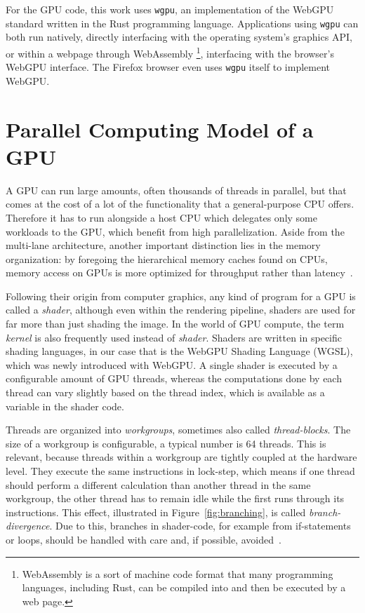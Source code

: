 For the GPU code, this work uses \texttt{wgpu}, an implementation of the WebGPU
standard written in the Rust programming language.
Applications using \texttt{wgpu} can both run natively, directly interfacing with the
operating system's graphics API,
or within a webpage through WebAssembly%
\footnote{WebAssembly is a sort of machine code format that many programming
languages, including Rust, can be compiled into
and then be executed by a web page.},
interfacing with the browser's WebGPU interface.
The Firefox browser even uses \texttt{wgpu} itself to implement WebGPU\@.


\section{Parallel Computing Model of a GPU}\label{sec:gpu_model}

A GPU can run large amounts, often thousands of threads in parallel,
but that comes at the cost of a lot of the functionality
that a general-purpose CPU offers.
Therefore it has to run alongside a host CPU which delegates only some
workloads to the GPU, which benefit from high parallelization.
Aside from the multi-lane architecture, another important distinction lies in
the memory organization:
by foregoing the hierarchical memory caches found on CPUs,
memory access on GPUs is more optimized for throughput rather than
latency~\cite{Patterson2016}.

Following their origin from computer graphics, any kind of program for a GPU is
called a \emph{shader}, although even within the rendering pipeline, shaders
are used for far more than just shading the image.
In the world of GPU compute, the term \emph{kernel} is also frequently used
instead of \emph{shader}.
Shaders are written in specific shading languages,
in our case that is the WebGPU Shading Language (WGSL),
which was newly introduced with WebGPU\@.
A single shader is executed by a configurable amount of GPU threads,
whereas the computations done by each thread can vary slightly
based on the thread index,
which is available as a variable in the shader code.

Threads are organized into \emph{workgroups},
sometimes also called \emph{thread-blocks}.
The size of a workgroup is configurable,
a typical number is 64 threads.
This is relevant,
because threads within a workgroup are tightly coupled at the hardware level.
They execute the same instructions in lock-step,
which means if one thread should perform a different calculation than another
thread in the same workgroup,
the other thread has to remain idle while the first runs through its
instructions.
This effect, illustrated in Figure~\ref{fig:branching}, is called
\emph{branch-divergence}.
Due to this, branches in shader-code,
for example from if-statements or loops,
should be handled with care and, if possible, avoided~\cite{Hijma2023}.


